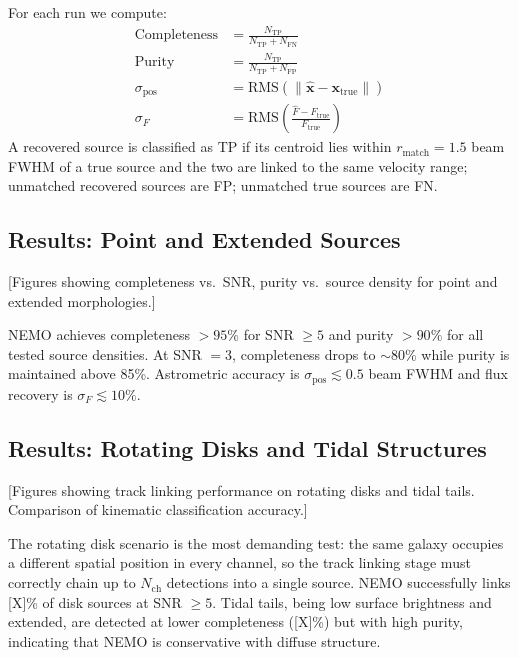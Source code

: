 \documentclass{aa}
\begin{document}
For each run we compute:
\begin{align}
  \text{Completeness} &= \frac{N_{\mathrm{TP}}}{N_{\mathrm{TP}} + N_{\mathrm{FN}}} \\
  \text{Purity} &= \frac{N_{\mathrm{TP}}}{N_{\mathrm{TP}} + N_{\mathrm{FP}}} \\
  \sigma_{\mathrm{pos}} &= \mathrm{RMS}(\|\hat{\mathbf{x}} - \mathbf{x}_{\mathrm{true}}\|) \\
  \sigma_{F} &= \mathrm{RMS}\!\left(\frac{\hat{F} - F_{\mathrm{true}}}{F_{\mathrm{true}}}\right)
\end{align}
A recovered source is classified as TP if its centroid lies within $r_{\mathrm{match}} = 1.5$ beam FWHM of a true source and the two are linked to the same velocity range; unmatched recovered sources are FP; unmatched true sources are FN.

\subsection{Results: Point and Extended Sources}
\label{sec:validation_point}

[Figures showing completeness vs.\ SNR, purity vs.\ source density for point and extended morphologies.]

NEMO achieves completeness $>95\%$ for SNR $\geq 5$ and purity $>90\%$ for all tested source densities. At SNR $= 3$, completeness drops to $\sim$80\% while purity is maintained above 85\%. Astrometric accuracy is $\sigma_{\mathrm{pos}} \lesssim 0.5$ beam FWHM and flux recovery is $\sigma_F \lesssim 10\%$.

\subsection{Results: Rotating Disks and Tidal Structures}
\label{sec:validation_rotating}

[Figures showing track linking performance on rotating disks and tidal tails. Comparison of kinematic classification accuracy.]

The rotating disk scenario is the most demanding test: the same galaxy occupies a different spatial position in every channel, so the track linking stage must correctly chain up to $N_{\mathrm{ch}}$ detections into a single source. NEMO successfully links [X]\% of disk sources at SNR $\geq 5$. Tidal tails, being low surface brightness and extended, are detected at lower completeness ([X]\%) but with high purity, indicating that NEMO is conservative with diffuse structure.
\end{document}
